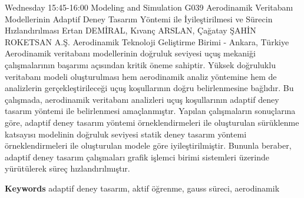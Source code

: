 
    \begin{abstract_basarim}
    {Wednesday 15:45-16:00}
    {Modeling and Simulation}
    {G039}
    {Aerodinamik Veritabanı Modellerinin Adaptif Deney Tasarım Yöntemi ile İyileştirilmesi ve Sürecin Hızlandırılması}
    {%
    Ertan DEMİRAL, Kıvanç ARSLAN, Çağatay ŞAHİN}
    {%
    }
    {%
    ROKETSAN A.Ş. Aerodinamik Teknoloji Geliştirme Birimi - Ankara, Türkiye}
    Aerodinamik veritabanı modellerinin doğruluk seviyesi uçuş mekaniği çalışmalarının başarımı açısından kritik öneme sahiptir. Yüksek doğruluklu veritabanı modeli oluşturulması hem aerodinamik analiz yöntemine hem de analizlerin gerçekleştirileceği uçuş koşullarının doğru belirlenmesine bağlıdır. Bu çalışmada, aerodinamik veritabanı analizleri uçuş koşullarının adaptif deney tasarım yöntemi ile belirlenmesi amaçlanmıştır. Yapılan çalışmaların sonuçlarına göre, adaptif deney tasarım yöntemi örneklendirmeleri ile oluşturulan sürüklenme katsayısı modelinin doğruluk seviyesi statik deney tasarım yöntemi örneklendirmeleri ile oluşturulan modele göre iyileştirilmiştir. Bununla beraber, adaptif deney tasarım çalışmaları grafik işlemci birimi sistemleri üzerinde yürütülerek süreç hızlandırılmıştır. 
    
        \textbf{Keywords} \newline{}adaptif deney tasarım, aktif öğrenme, gauss süreci, aerodinamik
    \end{abstract_basarim}
    